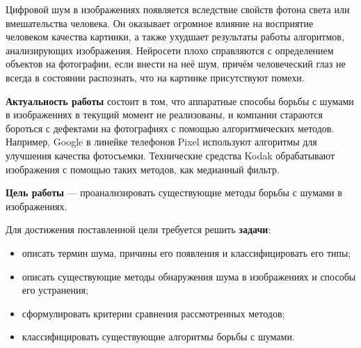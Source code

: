 Цифровой шум в изображениях появляется вследствие свойств фотона света или вмешательства человека.
Он оказывает огромное влияние на восприятие человеком качества картинки, а также ухудшает результаты работы алгоритмов, анализирующих изображения. 
Нейросети плохо справляются с определением объектов на фотографии, если внести на неё шум, причём человеческий глаз не всегда в состоянии распознать, что на картинке присутствуют помехи.

\textbf{Актуальность работы} состоит в том, что аппаратные способы борьбы с шумами в изображениях в текущий момент не реализованы, и компании стараются бороться с дефектами на фотографиях с помощью алгоритмических методов. 
Например, Google в линейке телефонов Pixel используют алгоритмы для улучшения качества фотосъемки.
Технические средства Kodak обрабатывают изображения с помощью таких методов, как медианный фильтр.

\textbf{Цель работы} --- проанализировать существующие методы борьбы с шумами в изображениях.

Для достижения поставленной цели требуется решить \textbf{задачи}:
\begin{itemize}
\item описать термин шума, причины его появления и классифицировать его типы;
\item описать существующие методы обнаружения шума в изображениях и способы его устранения;
\item сформулировать критерии сравнения рассмотренных методов;
\item классифицировать существующие алгоритмы борьбы с шумами.
\end{itemize}
